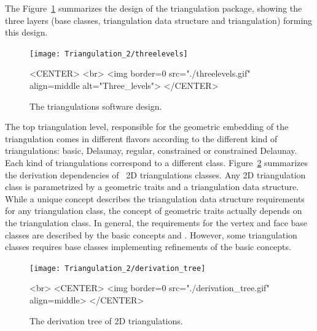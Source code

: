 The Figure~\ref{2D_Triangulation_Fig_three_levels} summarizes the design of the
triangulation package, showing the  three layers
(base classes, triangulation data structure and triangulation)
forming this design.

\begin{figure}
\begin{ccTexOnly}
\begin{center}
\texttt{[image: Triangulation\_2/threelevels]}
\end{center}
\end{ccTexOnly}

\begin{ccHtmlOnly}
<CENTER>
<br>
<img border=0 src="./threelevels.gif"  align=middle alt="Three_levels">
</CENTER>
\end{ccHtmlOnly}

\caption{The triangulations software design.
\label{2D_Triangulation_Fig_three_levels}}
\end{figure}

The top triangulation  level, responsible for the geometric 
embedding of the  triangulation comes in different flavors 
according to the different kind of triangulations:
basic, Delaunay, regular, constrained or constrained Delaunay.
Each kind of triangulations correspond to a different
class. 
Figure~\ref{2D_Triangulation_Fig_derivation_tree}  summarizes the derivation dependencies
of \cgal\ 2D triangulations classes.
Any 2D triangulation class is parametrized by
a geometric traits and a triangulation data structure.
While a  unique concept 
describes the   triangulation data structure requirements
for any  triangulation class, 
the concept of geometric traits actually depends
on the  triangulation class.
In general, the requirements for the vertex and face base classes 
are described by the basic concepts 
and  . However, some  triangulation
classes requires base classes implementing
refinements 
of the basic concepts.


\begin{figure}
\begin{ccTexOnly}
\begin{center}
\texttt{[image: Triangulation\_2/derivation\_tree]} 
\end{center}
\end{ccTexOnly}

\begin{ccHtmlOnly}
<br>
<CENTER>
<img border=0 src="./derivation_tree.gif" align=middle>
</CENTER>
\end{ccHtmlOnly}

\caption{The derivation tree of 2D triangulations.}
\label{2D_Triangulation_Fig_derivation_tree}
\end{figure}

